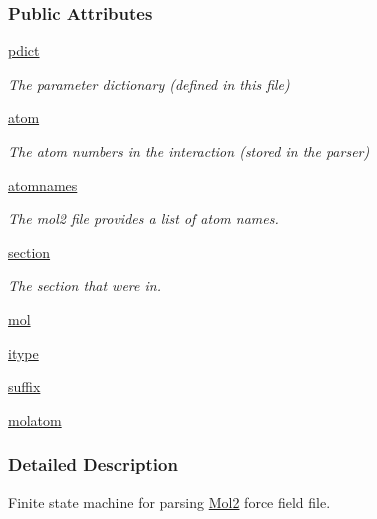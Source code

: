 \subsubsection*{Public Attributes}
\begin{DoxyCompactItemize}
\item 
\hyperlink{classsrc_1_1amberio_1_1Mol2__Reader_ab3bdb2a19829da102c022571071b6fe7}{pdict}
\begin{DoxyCompactList}\small\item\em The parameter dictionary (defined in this file) \end{DoxyCompactList}\item 
\hyperlink{classsrc_1_1amberio_1_1Mol2__Reader_a2de3ca5f954f0589ca409b63d6b54647}{atom}
\begin{DoxyCompactList}\small\item\em The atom numbers in the interaction (stored in the parser) \end{DoxyCompactList}\item 
\hyperlink{classsrc_1_1amberio_1_1Mol2__Reader_aa6167c3fa2450ab7e777e62662a0a074}{atomnames}
\begin{DoxyCompactList}\small\item\em The mol2 file provides a list of atom names. \end{DoxyCompactList}\item 
\hyperlink{classsrc_1_1amberio_1_1Mol2__Reader_ad998286e913c58648a6b0517adab70c7}{section}
\begin{DoxyCompactList}\small\item\em The section that we\textquotesingle{}re in. \end{DoxyCompactList}\item 
\hyperlink{classsrc_1_1amberio_1_1Mol2__Reader_ab577377b90a80b0708f647415a65a709}{mol}
\item 
\hyperlink{classsrc_1_1amberio_1_1Mol2__Reader_a364bcccbbdca6d894b8329b6f8434010}{itype}
\item 
\hyperlink{classsrc_1_1amberio_1_1Mol2__Reader_af3c71592f1021771b3529bf76ca19a98}{suffix}
\item 
\hyperlink{classsrc_1_1amberio_1_1Mol2__Reader_ac8eda87d78836d40c3df24d2f40d8958}{molatom}
\end{DoxyCompactItemize}


\subsubsection{Detailed Description}
Finite state machine for parsing \hyperlink{namespacesrc_1_1Mol2}{Mol2} force field file. 

